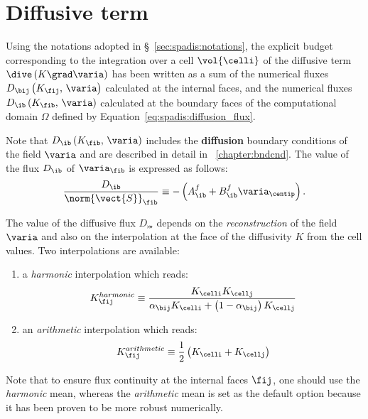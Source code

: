 \section{Diffusive term}\label{sec:spadis:diffusion}
Using the notations adopted in \S~\ref{sec:spadis:notations},
the explicit budget corresponding to the integration over a cell
$\vol{\celli}$ of the diffusive term $\dive \left( K \grad \varia \right) $
has been written as a sum of the
numerical fluxes $D_{\bij} \left( K_{\fij} , \, \varia \right)$ calculated at the internal faces,
 and the numerical fluxes $D_\ib \left( K_{\fib} , \, \varia \right)$ calculated at the
boundary faces of the computational domain $\Omega$ defined by Equation~\eqref{eq:spadis:diffusion_flux}.

Note that $D_\ib \left( K_{\fib} , \, \varia \right)$ includes the \textbf{diffusion} boundary conditions of the field $\varia$
 and are described in detail in \chaptername~\ref{chapter:bndcnd}. The value of the flux $D_\ib $ of $\varia_{\fib}$ is expressed as follows:
\begin{equation}\label{eq:spadis:boundary_flux}%
\dfrac{D_\ib}{\norm{\vect{S}}_{\fib}}  \equiv -\left(A_\ib^f + B_\ib^f \varia_{\centip}\right).
\end{equation}

The value of the diffusive flux $D_{\bij} $ depends on the \emph{reconstruction} of the field $\varia$ and also on the interpolation at the face  of the diffusivity $K$ from the cell values. Two interpolations are available:
%
\begin{enumerate}[ label=\roman{*}/, ref=(\roman{*})]
\item a \emph{harmonic} interpolation which reads:
\begin{equation}\label{eq:spadis:harmonic_viscosity}
K_{\fij}^{harmonic} \equiv  \dfrac{K_{\celli} K_{\cellj}}{\alpha_{\bij} K_{\celli} + \left( 1 - \alpha_{\bij}\right)K_{\cellj}}
\end{equation}
\item an \emph{arithmetic} interpolation which reads:
\begin{equation}
K_{\fij}^{arithmetic} \equiv  \dfrac{1}{2} \left( K_{\celli} + K_{\cellj}\right)
\end{equation}
\end{enumerate}
Note that to ensure flux continuity at the internal faces $\fij$, one should use the \emph{harmonic} mean,
whereas the \emph{arithmetic} mean is set as the default option because it has been proven to be more robust numerically.

